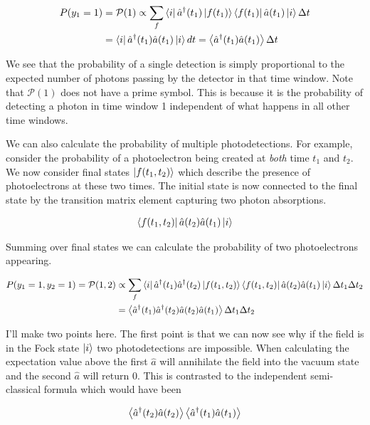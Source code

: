 \documentclass[12pt]{article}
\begin{document}
\begin{align}
P(y_{1}=1) &= \mathcal{P}(1) \propto \sum_f \bra{i} \hat{a}^{\dag}(t_{1})\ket{f(t_{1})}\bra{f(t_{1})}\hat{a}(t_{1}) \ket{i}\Delta t\\
&= \bra{i} \hat{a}^{\dag}(t_{1}) \hat{a}(t_{1}) \ket{i}dt = \Braket{\hat{a}^{\dag}(t_1) \hat{a}(t_1)}\Delta t
\end{align}

We see that the probability of a single detection is simply proportional to the expected number of photons passing by the detector in that time window. Note that $\mathcal{P}(1)$ does not have a prime symbol. This is because it is the probability of detecting a photon in time window 1 independent of what happens in all other time windows.

We can also calculate the probability of multiple photodetections. For example, consider the probability of a photoelectron being created at \textit{both} time $t_1$ and $t_2$. We now consider final states $\ket{f(t_1,t_2)}$ which describe the presence of photoelectrons at these two times. The initial state is now connected to the final state by the transition matrix element capturing two photon absorptions.

\begin{align}
\bra{f(t_1,t_2)}\hat{a}(t_2)\hat{a}(t_1)\ket{i}
\end{align}

Summing over final states we can calculate the probability of two photoelectrons appearing.

\begin{align}
P(y_1=1,y_2=1) = \mathcal{P}(1,2) &\propto \sum_{f}\bra{i}\hat{a}^{\dag}(t_1)\hat{a}^{\dag}(t_2)\ket{f(t_1,t_2)}\bra{f(t_1,t_2)}\hat{a}(t_2)\hat{a}(t_1)\ket{i}\Delta t_1 \Delta t_2\\
&= \Braket{\hat{a}^{\dag}(t_1)\hat{a}^{\dag}(t_2)\hat{a}(t_2)\hat{a}(t_1)}\Delta t_1 \Delta t_2
\end{align}

I'll make two points here. The first point is that we can now see why if the field is in the Fock state $\ket{i}$ two photodetections are impossible. When calculating the expectation value above the first $\hat{a}$ will annihilate the field into the vacuum state and the second $\hat{a}$ will return 0. This is contrasted to the independent semi-classical formula which would have been

\begin{align}
\Braket{\hat{a}^{\dag}(t_2) \hat{a}(t_2)} \Braket{\hat{a}^{\dag}(t_1) \hat{a}(t_1)}
\end{align}
\end{document}
